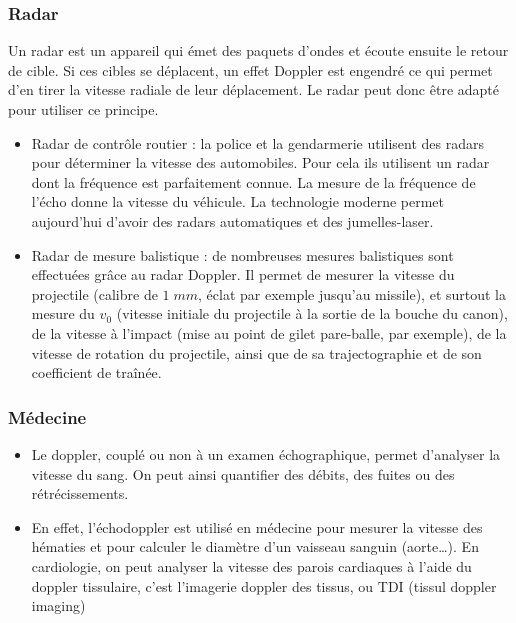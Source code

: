 \documentclass[11pt,a4paper]{article}
\begin{document}
\subsubsection{Radar}
Un radar est un appareil qui émet des paquets d’ondes et écoute ensuite le retour de cible. Si ces cibles se déplacent, un effet Doppler est engendré ce qui permet d’en tirer la vitesse radiale de leur déplacement. Le radar peut donc être adapté pour utiliser ce principe.
\begin{itemize}
    \item Radar de contrôle routier : la police et la gendarmerie utilisent des radars pour déterminer la vitesse des automobiles. Pour cela ils utilisent un radar dont la fréquence est parfaitement connue. La mesure de la fréquence de l’écho donne la vitesse du véhicule. La technologie moderne permet aujourd’hui d’avoir des radars automatiques et des jumelles-laser.
	\item Radar de mesure balistique : de nombreuses mesures balistiques sont effectuées grâce au radar Doppler. Il permet de mesurer la vitesse du projectile (calibre de $1\; mm$, éclat par exemple jusqu’au missile), et surtout la mesure du $v_0$ (vitesse initiale du projectile à la sortie de la bouche du canon), de la vitesse à l’impact (mise au point de gilet pare-balle, par exemple), de la vitesse de rotation du projectile, ainsi que de sa trajectographie et de son coefficient de traînée. 
\end{itemize}
	
\subsubsection{Médecine}
\begin{itemize}
    \item Le doppler, couplé ou non à un examen échographique, permet d’analyser la vitesse du sang. On peut ainsi quantifier des débits, des fuites ou des rétrécissements.
    \item En effet, l’échodoppler est utilisé en médecine pour mesurer la vitesse des hématies et pour calculer le diamètre d’un vaisseau sanguin (aorte…).
	En cardiologie, on peut analyser la vitesse des parois cardiaques à l’aide du doppler tissulaire, c’est l’imagerie doppler des tissus, ou TDI (tissul doppler imaging)
\end{itemize}
\end{document}

